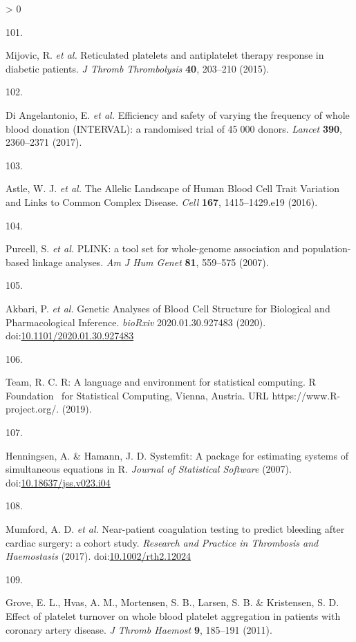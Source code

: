 \documentclass[11pt,twoside]{bristolthesis}
\newlength{\cslhangindent}
\newlength{\csllabelwidth}
\newenvironment{CSLReferences}[2] %
 {%
  \setlength{\parindent}{0pt}
  \ifodd #1 \everypar{\setlength{\hangindent}{\cslhangindent}}\ignorespaces\fi
  \ifnum #2 > 0
  \setlength{\parskip}{#2\baselineskip}
  \fi
 }%
 {}
\newcommand{\CSLLeftMargin}[1]{\parbox[t]{\csllabelwidth}{#1}}
\newcommand{\CSLRightInline}[1]{\parbox[t]{\linewidth - \csllabelwidth}{#1}\break}
\begin{document}
\begin{CSLReferences}{0}{0}
\leavevmode\hypertarget{ref-Mijovic2015a}{}%
\CSLLeftMargin{101. }
\CSLRightInline{Mijovic, R. \emph{et al.} {Reticulated platelets and antiplatelet therapy response in diabetic patients}. \emph{J Thromb Thrombolysis} \textbf{40}, 203--210 (2015).}

\leavevmode\hypertarget{ref-DiAngelantonio2017}{}%
\CSLLeftMargin{102. }
\CSLRightInline{Di Angelantonio, E. \emph{et al.} {Efficiency and safety of varying the frequency of whole blood donation (INTERVAL): a randomised trial of 45 000 donors}. \emph{Lancet} \textbf{390}, 2360--2371 (2017).}

\leavevmode\hypertarget{ref-Astle2016}{}%
\CSLLeftMargin{103. }
\CSLRightInline{Astle, W. J. \emph{et al.} {The Allelic Landscape of Human Blood Cell Trait Variation and Links to Common Complex Disease}. \emph{Cell} \textbf{167}, 1415--1429.e19 (2016).}

\leavevmode\hypertarget{ref-Purcell2007a}{}%
\CSLLeftMargin{104. }
\CSLRightInline{Purcell, S. \emph{et al.} {PLINK: a tool set for whole-genome association and population-based linkage analyses}. \emph{Am J Hum Genet} \textbf{81}, 559--575 (2007).}

\leavevmode\hypertarget{ref-Akbari2020}{}%
\CSLLeftMargin{105. }
\CSLRightInline{Akbari, P. \emph{et al.} {Genetic Analyses of Blood Cell Structure for Biological and Pharmacological Inference}. \emph{bioRxiv} 2020.01.30.927483 (2020). doi:\href{https://doi.org/10.1101/2020.01.30.927483}{10.1101/2020.01.30.927483}}

\leavevmode\hypertarget{ref-Team2019a}{}%
\CSLLeftMargin{106. }
\CSLRightInline{Team, R. C. {R: A language and environment for statistical computing. R Foundation~ for Statistical Computing, Vienna, Austria. URL https://www.R-project.org/.} (2019).}

\leavevmode\hypertarget{ref-Henningsen2007}{}%
\CSLLeftMargin{107. }
\CSLRightInline{Henningsen, A. \& Hamann, J. D. {Systemfit: A package for estimating systems of simultaneous equations in R}. \emph{Journal of Statistical Software} (2007). doi:\href{https://doi.org/10.18637/jss.v023.i04}{10.18637/jss.v023.i04}}

\leavevmode\hypertarget{ref-Mumford2017}{}%
\CSLLeftMargin{108. }
\CSLRightInline{Mumford, A. D. \emph{et al.} {Near-patient coagulation testing to predict bleeding after cardiac surgery: a cohort study}. \emph{Research and Practice in Thrombosis and Haemostasis} (2017). doi:\href{https://doi.org/10.1002/rth2.12024}{10.1002/rth2.12024}}

\leavevmode\hypertarget{ref-Grove2011a}{}%
\CSLLeftMargin{109. }
\CSLRightInline{Grove, E. L., Hvas, A. M., Mortensen, S. B., Larsen, S. B. \& Kristensen, S. D. {Effect of platelet turnover on whole blood platelet aggregation in patients with coronary artery disease}. \emph{J Thromb Haemost} \textbf{9}, 185--191 (2011).}


\end{CSLReferences}
\end{document}
